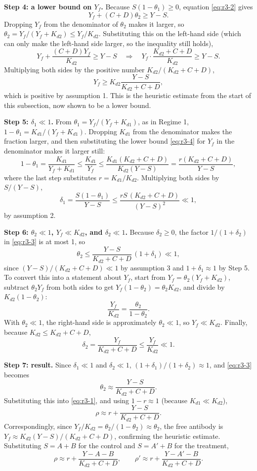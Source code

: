 \textbf{Step 4: a lower bound on $Y_f$.} Because $S(1-\theta_1)\ge0$,
equation \eqref{eq:r3-2} gives
$$
Y_f+(C+D)\theta_2\ge Y-S.
$$
Dropping $Y_f$ from the denominator of $\theta_2$ makes it larger, so
$\theta_2=Y_f/(Y_f+K_{d2})\le Y_f/K_{d2}$. Substituting this on the
left-hand side (which can only make the left-hand side larger, so the
inequality still holds),
$$
Y_f+\frac{(C+D)Y_f}{K_{d2}}\ge Y-S
\quad\Longrightarrow\quad
Y_f\cdot\frac{K_{d2}+C+D}{K_{d2}}\ge Y-S.
$$
Multiplying both sides by the positive number $K_{d2}/(K_{d2}+C+D)$,
\begin{equation}
Y_f\ge K_{d2}\frac{Y-S}{K_{d2}+C+D},
\label{eq:r3-4}
\end{equation}
which is positive by assumption 1. This is the heuristic estimate from
the start of this subsection, now shown to be a lower bound.

\textbf{Step 5: $\delta_1\ll1$.} From $\theta_1=Y_f/(Y_f+K_{d1})$, as in
Regime 1, $1-\theta_1=K_{d1}/(Y_f+K_{d1})$. Dropping $K_{d1}$ from the
denominator makes the fraction larger, and then substituting the lower
bound \eqref{eq:r3-4} for $Y_f$ in the denominator makes it larger
still:
$$
1-\theta_1
=\frac{K_{d1}}{Y_f+K_{d1}}
\le\frac{K_{d1}}{Y_f}
\le\frac{K_{d1}(K_{d2}+C+D)}{K_{d2}(Y-S)}
=\frac{r(K_{d2}+C+D)}{Y-S},
$$
where the last step substitutes $r=K_{d1}/K_{d2}$. Multiplying both sides
by $S/(Y-S)$,
$$
\delta_1
=\frac{S(1-\theta_1)}{Y-S}
\le\frac{rS\,(K_{d2}+C+D)}{(Y-S)^2}
\ll1,
$$
by assumption 2.

\textbf{Step 6: $\theta_2\ll1$, $Y_f\ll K_{d2}$, and $\delta_2\ll1$.}
Because $\delta_2\ge0$, the factor $1/(1+\delta_2)$ in \eqref{eq:r3-3} is
at most 1, so
$$
\theta_2\le\frac{Y-S}{K_{d2}+C+D}\,(1+\delta_1)\ll1,
$$
since $(Y-S)/(K_{d2}+C+D)\ll1$ by assumption 3 and $1+\delta_1\approx1$ by
Step 5. To convert this into a statement about $Y_f$, start from
$Y_f=\theta_2(Y_f+K_{d2})$, subtract $\theta_2Y_f$ from both sides to get
$Y_f(1-\theta_2)=\theta_2K_{d2}$, and divide by $K_{d2}(1-\theta_2)$:
$$
\frac{Y_f}{K_{d2}}=\frac{\theta_2}{1-\theta_2}.
$$
With $\theta_2\ll1$, the right-hand side is approximately $\theta_2\ll1$,
so $Y_f\ll K_{d2}$. Finally, because $K_{d2}\le K_{d2}+C+D$,
$$
\delta_2=\frac{Y_f}{K_{d2}+C+D}\le\frac{Y_f}{K_{d2}}\ll1.
$$

\textbf{Step 7: result.} Since $\delta_1\ll1$ and $\delta_2\ll1$,
$(1+\delta_1)/(1+\delta_2)\approx1$, and \eqref{eq:r3-3} becomes
$$
\theta_2\approx\frac{Y-S}{K_{d2}+C+D}.
$$
Substituting this into \eqref{eq:r3-1}, and using $1-r\approx1$ (because
$K_{d1}\ll K_{d2}$),
\begin{equation}
\rho\approx r+\frac{Y-S}{K_{d2}+C+D}.
\label{eq:r3-5}
\end{equation}
Correspondingly, since $Y_f/K_{d2}=\theta_2/(1-\theta_2)\approx\theta_2$,
the free antibody is $Y_f\approx K_{d2}(Y-S)/(K_{d2}+C+D)$, confirming the
heuristic estimate. Substituting $S=A+B$ for the control and $S=A'+B$
for the treatment,
$$
\rho\approx r+\frac{Y-A-B}{K_{d2}+C+D},
\qquad
\rho'\approx r+\frac{Y-A'-B}{K_{d2}+C+D}.
$$

